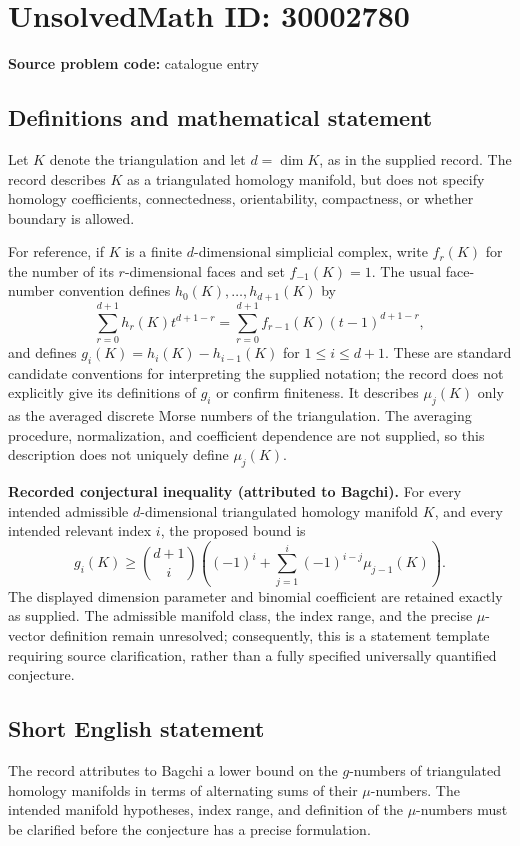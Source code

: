 \documentclass[11pt]{article}
\begin{document}
\section*{UnsolvedMath ID: 30002780}
\textbf{Source problem code:} catalogue entry
\subsection{Definitions and mathematical statement}
Let \(K\) denote the triangulation and let \(d=\dim K\), as in the supplied record. The record describes \(K\) as a triangulated homology manifold, but does not specify homology coefficients, connectedness, orientability, compactness, or whether boundary is allowed.

For reference, if \(K\) is a finite \(d\)-dimensional simplicial complex, write \(f_r(K)\) for the number of its \(r\)-dimensional faces and set \(f_{-1}(K)=1\). The usual face-number convention defines \(h_0(K),\ldots,h_{d+1}(K)\) by
\[
\sum_{r=0}^{d+1}h_r(K)t^{d+1-r}
=\sum_{r=0}^{d+1}f_{r-1}(K)(t-1)^{d+1-r},
\]
and defines \(g_i(K)=h_i(K)-h_{i-1}(K)\) for \(1\leq i\leq d+1\). These are standard candidate conventions for interpreting the supplied notation; the record does not explicitly give its definitions of \(g_i\) or confirm finiteness. It describes \(\mu_j(K)\) only as the averaged discrete Morse numbers of the triangulation. The averaging procedure, normalization, and coefficient dependence are not supplied, so this description does not uniquely define \(\mu_j(K)\).

\textbf{Recorded conjectural inequality (attributed to Bagchi).} For every intended admissible \(d\)-dimensional triangulated homology manifold \(K\), and every intended relevant index \(i\), the proposed bound is
\[
 g_i(K)\geq \binom{d+1}{i}
 \left((-1)^i+\sum_{j=1}^{i}(-1)^{i-j}\mu_{j-1}(K)\right).
\]
The displayed dimension parameter and binomial coefficient are retained exactly as supplied. The admissible manifold class, the index range, and the precise \(\mu\)-vector definition remain unresolved; consequently, this is a statement template requiring source clarification, rather than a fully specified universally quantified conjecture.
\subsection{Short English statement}
The record attributes to Bagchi a lower bound on the \(g\)-numbers of triangulated homology manifolds in terms of alternating sums of their \(\mu\)-numbers. The intended manifold hypotheses, index range, and definition of the \(\mu\)-numbers must be clarified before the conjecture has a precise formulation.
\end{document}
